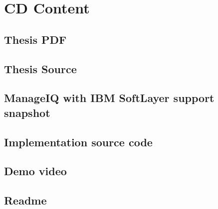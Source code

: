 
\chapter{CD Content}
\section{Thesis PDF}
\section{Thesis Source}
\section{ManageIQ with IBM SoftLayer support snapshot}
\section{Implementation source code}
\section{Demo video}
\section{Readme}

